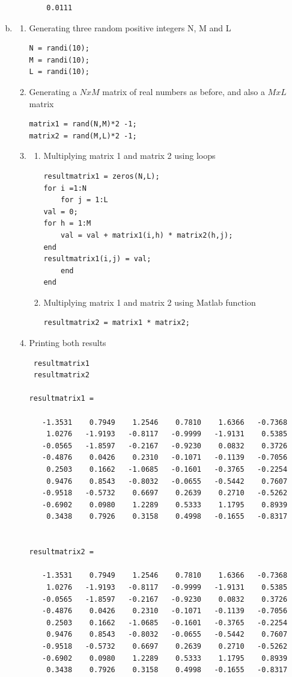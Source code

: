 \documentclass[12pt]{article}
\begin{document}
\begin{onehalfspace}
\begin{enumerate}[(a)]
\begin{enumerate}[1.]
\begin{lstlisting}
    0.0111
\end{lstlisting}
	\end{enumerate}
	\item
	\begin{enumerate}[1.]
\item
Generating three random positive integers N, M and L
\begin{lstlisting}
N = randi(10);
M = randi(10);
L = randi(10);
\end{lstlisting}
\item
Generating a $NxM$ matrix of real numbers as before, and also a $MxL$ matrix
\begin{lstlisting}
matrix1 = rand(N,M)*2 -1;
matrix2 = rand(M,L)*2 -1;
\end{lstlisting}
\item
\begin{enumerate}[3.1]
	\item
	Multiplying matrix 1 and matrix 2 using loops
	\begin{lstlisting}
resultmatrix1 = zeros(N,L);
for i =1:N
	for j = 1:L  
val = 0;
for h = 1:M
	val = val + matrix1(i,h) * matrix2(h,j);
end
resultmatrix1(i,j) = val;
	end
end
	\end{lstlisting}
	\item
	Multiplying matrix 1 and matrix 2 using Matlab function
	\begin{lstlisting}
resultmatrix2 = matrix1 * matrix2;
	\end{lstlisting}
\end{enumerate}
\item
Printing both results
\begin{lstlisting}
 resultmatrix1
 resultmatrix2

resultmatrix1 =

   -1.3531    0.7949    1.2546    0.7810    1.6366   -0.7368
    1.0276   -1.9193   -0.8117   -0.9999   -1.9131    0.5385
   -0.0565   -1.8597   -0.2167   -0.9230    0.0832    0.3726
   -0.4876    0.0426    0.2310   -0.1071   -0.1139   -0.7056
    0.2503    0.1662   -1.0685   -0.1601   -0.3765   -0.2254
    0.9476    0.8543   -0.8032   -0.0655   -0.5442    0.7607
   -0.9518   -0.5732    0.6697    0.2639    0.2710   -0.5262
   -0.6902    0.0980    1.2289    0.5333    1.1795    0.8939
    0.3438    0.7926    0.3158    0.4998   -0.1655   -0.8317


resultmatrix2 =

   -1.3531    0.7949    1.2546    0.7810    1.6366   -0.7368
    1.0276   -1.9193   -0.8117   -0.9999   -1.9131    0.5385
   -0.0565   -1.8597   -0.2167   -0.9230    0.0832    0.3726
   -0.4876    0.0426    0.2310   -0.1071   -0.1139   -0.7056
    0.2503    0.1662   -1.0685   -0.1601   -0.3765   -0.2254
    0.9476    0.8543   -0.8032   -0.0655   -0.5442    0.7607
   -0.9518   -0.5732    0.6697    0.2639    0.2710   -0.5262
   -0.6902    0.0980    1.2289    0.5333    1.1795    0.8939
    0.3438    0.7926    0.3158    0.4998   -0.1655   -0.8317


\end{lstlisting}
\end{enumerate}
\end{enumerate}
\end{onehalfspace}
\end{document}
